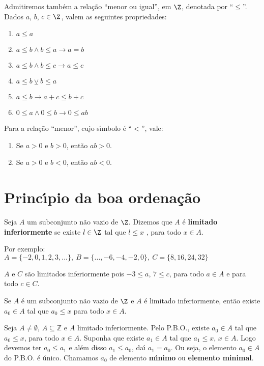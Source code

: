 Admitiremos tamb{\'e}m a rela{\c c}{\~a}o ``menor ou igual'', em $\Z$, denotada por ``$\leq$''. Dados $a$, $b$, $c\in \Z$, valem as seguintes propriedades:
\begin{enumerate}
\item $a\leq a$
\item $a\leq b\wedge b\leq a\rightarrow a=b$
\item $a\leq b\wedge b\leq c\rightarrow a\leq c$
\item $a\leq b\veebar b\leq a$
\item $a\leq b\rightarrow a+c\leq b+c$
\item $0\leq a\wedge 0\leq b\rightarrow 0\leq ab$
\end{enumerate}

Para a rela{\c c}{\~a}o ``menor'', cujo s{\'\i}mbolo {\'e} ``$<$'', vale:
\begin{enumerate}
\item Se $a> 0$ e $b > 0$, ent\~ao $ab > 0$.
\item Se $a > 0$ e $b<0$, ent\~ao $ab<0$.
\end{enumerate}

\section{Princ{\'\i}pio da boa ordena{\c c}{\~a}o}

\begin{definicao} 
	Seja $A$ um subconjunto n{\~a}o vazio de $\Z$. Dizemos que $A$ {\'e} \textbf{limitado inferiormente} se existe $l \in \Z$ tal que $l \leq x$
	, para todo $x\in A$.
\end{definicao}

Por exemplo:\\
$A=\{-2,0,1,2,3,...\},\ B=\{...,-6,-4,-2,0\},\ C=\{8,16,24,32\}$

$A$ e $C$ s{\~a}o limitados inferiormente pois $-3\leq a$, $7\leq c$, para todo $a\in A$ e para todo $c\in C$.

\begin{definicao}
	Se $A$ {\'e} um subconjunto n{\~a}o vazio de $\Z$ e $A$ {\'e} limitado inferiormente, ent{\~a}o existe $a_{0}\in A$ tal que $a_{0}\leq x$ para todo $x\in A$.
\end{definicao}

Seja $A\neq\emptyset$, $A\subseteq\mathbb{Z}$ e $A$ limitado inferiormente. Pelo P.B.O., existe $a_{0}\in A$ tal que $a_{0}\leq x$, para todo $x\in A$. Suponha que existe $a_{1}\in A$ tal que $a_{1}\leq x$, $x\in A$. Logo devemos ter $a_{0}\leq a_{1}$ e al\'em disso $a_{1}\leq a_{0}$, da{\'\i} $a_{1}=a_{0}$. Ou seja, o elemento $a_{0}\in A$ do P.B.O. {\'e} {\'u}nico. Chamamos $a_{0}$ de elemento \textbf{m{\'\i}nimo} ou \textbf{elemento minimal}.

